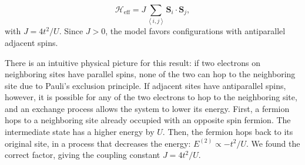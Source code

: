 \begin{equation}
\mathcal{H}_{\text{eff}} = J \sum_{\left\langle i, j \right\rangle} \bm S_i \cdot \bm S_j ,
\end{equation}
with $J = 4 t^2 / U$.
Since $J > 0$, the model favors configurations with antiparallel adjacent spins.

There is an intuitive physical picture for this result: if two electrons on neighboring sites have parallel spins, none of the two can hop to the neighboring site due to Pauli's exclusion principle.
If adjacent sites have antiparallel spins, however, it is possible for any of the two electrons to hop to the neighboring site, and an exchange process allows the system to lower its energy.
First, a fermion hops to a neighboring site already occupied with an opposite spin fermion.
The intermediate state has a higher energy by $U$.
Then, the fermion hops back to its original site, in a process that decreases the energy: $E^{(2)} \propto - t^2 / U$.
We found the correct factor, giving the coupling constant $J = 4 t^2 / U$.